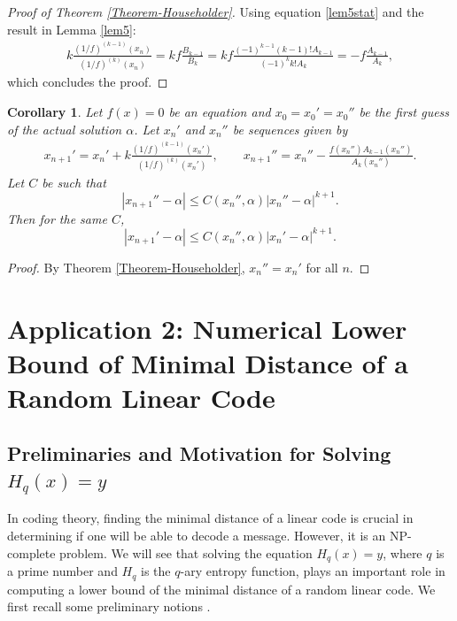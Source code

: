\documentclass{article}
\newtheorem{corollary}{Corollary}[theorem]
\begin{document}
\begin{proof}[Proof of Theorem \ref{Theorem-Householder}]
	Using equation \eqref{lem5stat} and the result in Lemma \ref{lem5}:
	\begin{align*}
		k\frac{(1/f)^{(k-1)}(x_{n})}{(1/f)^{(k)}(x_{n})} = 
		kf\frac{B_{k-1}}{B_{k}} = 
		kf\frac{(-1)^{k-1}(k-1)!A_{k-1}}{(-1)^{k}k!A_{k}}
		=
		-f\frac{A_{k-1}}{A_{k}},
	\end{align*}
	which concludes the proof.
\end{proof} 
\medskip
\begin{corollary}
	Let $f(x)=0$ be an equation and $x_{0}=x_{0}'=x_{0}''$ be the first guess of the actual solution $\alpha$. Let $x_{n}'$ and $x_{n}''$ be sequences given  by
	\begin{equation}
		\begin{aligned}
			x_{n+1}' = x_{n}' + k\frac{(1/f)^{(k-1)}(x_{n}')}{(1/f)^{(k)}(x_{n}')},\qquad
			x_{n+1}'' = x_{n}'' -\frac{f(x_{n}'')A_{k-1}(x_{n}'')}{A_{k}(x_{n}'')}.
		\end{aligned}
	\end{equation}
	Let $C$ be such that 
	\[
	|x_{n+1}''-\alpha|\leq C(x_{n}'',\alpha)|x_{n}''-\alpha|^{k+1}.
	\]
	Then for the same $C$,
	\[
	|x_{n+1}'-\alpha|\leq C(x_{n}'',\alpha)|x_{n}'-\alpha|^{k+1}.
	\]
\end{corollary}
\begin{proof}
	By Theorem \ref{Theorem-Householder}, $x_{n}''=x_{n}'$ for all $n$. 
\end{proof}



\section{Application 2: Numerical Lower Bound of Minimal Distance of a Random Linear Code}
\subsection{Preliminaries and Motivation for Solving $H_{q}(x)=y$}
In coding theory, finding the minimal distance of a linear code is crucial in determining if one will be able to decode a message. However, it is an NP-complete problem. We will see that solving the equation $H_{q}(x)=y$, where $q$ is a prime number and $H_{q}$ is the  $q$-ary entropy function, plays an important role in computing a lower bound of the minimal distance of a random linear code. We first  recall some preliminary notions \cite{Meurer-2012, Barg-1997, vL98}. 
\end{document}
